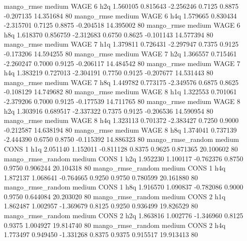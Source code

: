        mango_rmse     medium     WAGE                 6                  h2q  1.560105 0.815643 -2.256246 0.7125 0.8875 -0.207135   14.351684 80
       mango_rmse     medium     WAGE                 6                  h4q  1.579665 0.830434 -2.315701 0.7125 0.8875 -0.204518   14.395002 80
       mango_rmse     medium     WAGE                 6                  h8q  1.618370 0.856759 -2.312683 0.6750 0.8625 -0.101143   14.577394 80
       mango_rmse     medium     WAGE                 7                  h1q  1.379811 0.726431 -2.297947 0.7375 0.9125 -0.173206   14.594255 80
       mango_rmse     medium     WAGE                 7                  h2q  1.366557 0.715461 -2.260247 0.7000 0.9125 -0.206117   14.484542 80
       mango_rmse     medium     WAGE                 7                  h4q  1.383219 0.727013 -2.304191 0.7750 0.9125 -0.207677   14.531443 80
       mango_rmse     medium     WAGE                 7                  h8q  1.449782 0.773175 -2.349576 0.6875 0.8625 -0.108129   14.749682 80
       mango_rmse     medium     WAGE                 8                  h1q  1.322553 0.701061 -2.379206 0.7000 0.9125 -0.177539   14.711765 80
       mango_rmse     medium     WAGE                 8                  h2q  1.303916 0.689517 -2.337322 0.7375 0.9125 -0.206536   14.590954 80
       mango_rmse     medium     WAGE                 8                  h4q  1.323113 0.701372 -2.383427 0.7250 0.9000 -0.212587   14.638194 80
       mango_rmse     medium     WAGE                 8                  h8q  1.374041 0.737139 -2.444390 0.6750 0.8750 -0.115392   14.886323 80
mango_rmse_random     medium     CONS                 1                  h1q  2.051140 1.152011 -0.811128 0.8375 0.9625  0.871365   20.100602 80
mango_rmse_random     medium     CONS                 1                  h2q  1.952230 1.100117 -0.762376 0.8750 0.9750  0.906244   20.104318 80
mango_rmse_random     medium     CONS                 1                  h4q  1.872137 1.068641 -0.764665 0.9250 0.9750  0.780599   20.161880 80
mango_rmse_random     medium     CONS                 1                  h8q  1.916570 1.090837 -0.782086 0.9000 0.9750  0.644084   20.203020 80
mango_rmse_random     medium     CONS                 2                  h1q  1.862487 1.002957 -1.369679 0.8125 0.9250  0.936499   19.826529 80
mango_rmse_random     medium     CONS                 2                  h2q  1.863816 1.002776 -1.346960 0.8125 0.9375  1.004927   19.814740 80
mango_rmse_random     medium     CONS                 2                  h4q  1.773497 0.949450 -1.331268 0.8375 0.9375  0.915517   19.913413 80
